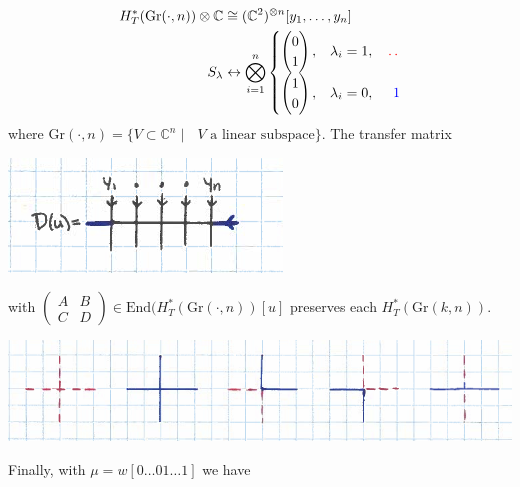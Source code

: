 \documentclass[12pt]{amsart}
\numberwithin{equation}{section}
\theoremstyle{definition}
\numberwithin{figure}{section}
\newcommand{\C}{\mathbb{C}}
\begin{document}
\begin{align*}
	&&H_T^*(\mathrm{Gr}(\cdot,n))\otimes\C&\cong (\C^2)^{\otimes n}[y_1,\dots,y_n]&\\
	&&S_\lambda& \leftrightarrow \bigotimes_{i=1}^n\begin{cases} 
\begin{pmatrix}
	0 \\
	1  
\end{pmatrix}, & \lambda_i=1, \quad \color{red}\dotfill \\
\begin{pmatrix}
	1 \\
	0  
\end{pmatrix}, & \lambda_i=0,\quad \ \color{blue}{1} 
\end{cases}
\end{align*}
where $\mathrm{Gr}(\cdot,n)=\lbrace V\subset\C^n\mid \text{ $V$ a linear subspace}\rbrace$. The transfer matrix
\begin{center}
	\includegraphics[]{lecture_diagrams_cropped_3.png}
\end{center}
with $\left(\begin{array}{cc}
	A & B \\
	C & D
\end{array}\right)\in\mathrm{End}( H_T^*(\mathrm{Gr}(\cdot,n))[u]$ preserves each $H_T^*(\mathrm{Gr}(k,n))$.
\begin{center}
	\includegraphics[scale=0.8]{lecture_diagrams_cropped_4.png}
\end{center}
Finally, with $\mu=w[0\dots01\dots1]$ we have
\end{document}

